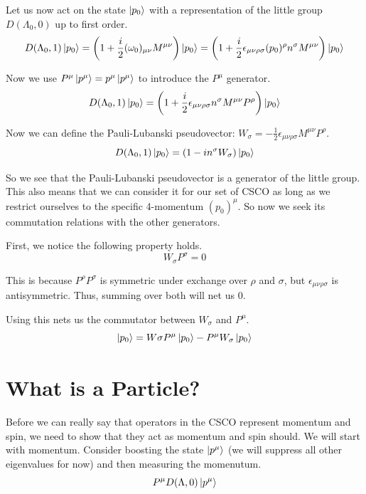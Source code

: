 \documentclass[12pt]{article}
\begin{document}
Let us now act on the state $\ket{p_0}$ with a representation of the little group $D(\Lambda_0,0)$ up to first order.
\begin{equation}
    D(\Lambda_0,1)\ket{p_0}=\left(1+\frac{i}{2}(\omega_0)_{\mu\nu}M^{\mu\nu}\right)\ket{p_0}=\left(1+\frac{i}{2}\epsilon_{\mu\nu\rho\sigma}(p_0)^\rho n^\sigma M^{\mu\nu}\right)\ket{p_0}
\end{equation}

Now we use $P^\mu\ket{p^\mu}=p^\mu\ket{p^\mu}$ to introduce the $P^\mu$ generator.
\begin{equation}
    D(\Lambda_0,1)\ket{p_0}=\left(1+\frac{i}{2}\epsilon_{\mu\nu\rho\sigma} n^\sigma M^{\mu\nu}P^\rho\right)\ket{p_0}
\end{equation}

Now we can define the Pauli-Lubanski pseudovector: $W_\sigma=-\frac{1}{2}\epsilon_{\mu\nu\rho\sigma} M^{\mu\nu}P^\rho$.
\begin{equation}
    D(\Lambda_0,1)\ket{p_0}=(1-in^\sigma W_\sigma)\ket{p_0}
\end{equation}

So we see that the Pauli-Lubanski pseudovector is a generator of the little group. This also means that we can consider it for our set of CSCO as long as we restrict ourselves to the specific 4-momentum $(p_0)^\mu$. So now we seek its commutation relations with the other generators.

First, we notice the following property holds.
\begin{equation}
    W_\sigma P^\sigma=0
\end{equation}

This is because $P^\rho P^\sigma$ is symmetric under exchange over $\rho$ and $\sigma$, but $\epsilon_{\mu\nu\rho\sigma}$ is antisymmetric. Thus, summing over both will net us 0.

Using this nets us the commutator between $W_\sigma$ and $P^\mu$.
\begin{equation}
    [W_\sigma,P^\mu]\ket{p_0}=W\sigma P^\mu \ket{p_0}-P^\mu W_\sigma \ket{p_0}
\end{equation}

\section{What is a Particle?}

Before we can really say that operators in the CSCO represent momentum and spin, we need to show that they act as momentum and spin should. We will start with momentum. Consider boosting the state $\ket{p^\mu}$ (we will suppress all other eigenvalues for now) and then measuring the momenutum.
\begin{equation}
    P^\mu D(\Lambda, 0) \ket{p^\mu}
\end{equation}
\end{document}

